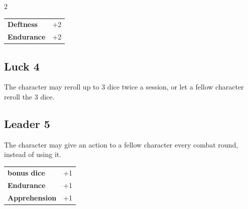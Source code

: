 \begin{multicols}{2}
\begin{tcolorbox}
\begin{tabular}{@{}ll@{}}
    \textbf{Deftness} & +2\\
    \textbf{Endurance} & +2\\
\end{tabular}


\end{tcolorbox}

\begin{tcolorbox}
    \subsection*{Luck \hfill \small{4 }}
    \tcblower
The character may reroll up to 3 dice twice a session, or let a fellow character reroll the 3 dice.


\vspace{3mm}



\end{tcolorbox}

\begin{tcolorbox}
    \subsection*{Leader \hfill \small{5 }}
    \tcblower
The character may give an action to a fellow character every combat round, instead of using it.


\vspace{3mm}

\begin{tabular}{@{}ll@{}}
    \textbf{bonus dice} & +1\\
    \textbf{Endurance} & +1\\
    \textbf{Apprehension} & +1\\
\end{tabular}


\end{tcolorbox}

\begin{tcolorbox}

\end{tcolorbox}
\end{multicols}
